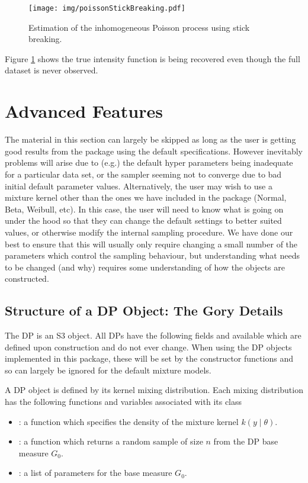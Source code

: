 \documentclass[nojss]{jss}
\begin{document}
\begin{figure}[tb]
\centering
\texttt{[image: img/poissonStickBreaking.pdf]}
\caption{Estimation of the inhomogeneous Poisson process using stick breaking.}
\label{fig:poissonStick}
\end{figure}
Figure \ref{fig:poissonStick} shows the true intensity function is being recovered even though the full dataset is never observed.



\section{Advanced Features}
The material in this section can largely be skipped as long as the user is getting good results from the  package using the default specifications. However inevitably problems will arise due to (e.g.) the default hyper parameters being inadequate for a particular data set, or the sampler seeming not to converge due to bad initial default parameter values. Alternatively, the user may wish to use a mixture kernel other than the ones we have included in the package (Normal, Beta, Weibull, etc). In this case, the user will need to know  what is going on under the hood so that they can change the default settings to better suited values, or otherwise modify the internal sampling procedure. We have done our best to ensure that this will usually only require changing a small number of the parameters which control the sampling behaviour, but understanding what needs to be changed (and why) requires some understanding of how the objects are constructed.

\subsection{Structure of a DP Object: The Gory Details}
The DP is an S3 object. All DPs have the following fields and available which are defined upon construction and do not ever change. When using the DP objects implemented in this package, these will be set by the constructor functions and so can largely be ignored for the default mixture models.

A DP object is defined by its kernel mixing distribution. Each mixing distribution has the following functions and variables associated with its class
\begin{itemize}
\item {}: a function which specifies the density of the mixture kernel $k(y \mid \theta)$.
\item {}: a function which returns a random sample of size $n$ from the DP base measure $G_0$.
\item {}: a list of parameters for the base measure $G_0$.
\end{itemize}
\end{document}
